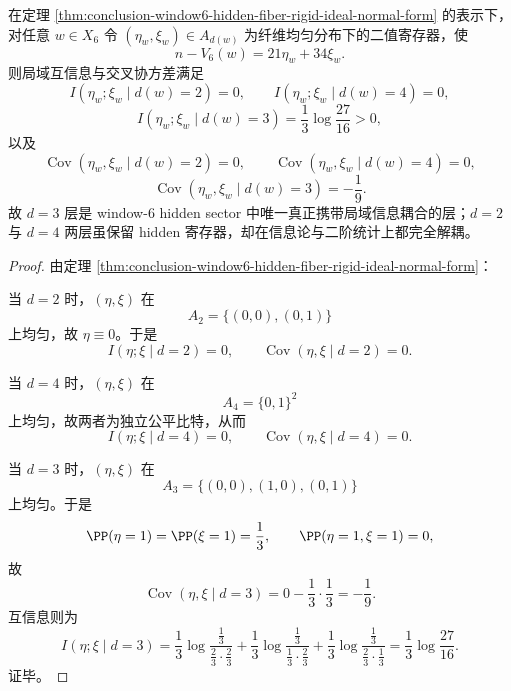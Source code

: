 \begin{theorem}\label{thm:conclusion-window6-d2-slice-unique-local-interaction-layer}
在定理 \ref{thm:conclusion-window6-hidden-fiber-rigid-ideal-normal-form} 的表示下，对任意 \(w\in X_6\) 令 \((\eta_w,\xi_w)\in A_{d(w)}\) 为纤维均匀分布下的二值寄存器，使
\[
n-V_6(w)=21\eta_w+34\xi_w.
\]
则局域互信息与交叉协方差满足
\[
I(\eta_w;\xi_w\mid d(w)=2)=0,\qquad
I(\eta_w;\xi_w\mid d(w)=4)=0,
\]
\[
I(\eta_w;\xi_w\mid d(w)=3)
=
\frac13\log\frac{27}{16}>0,
\]
以及
\[
\operatorname{Cov}(\eta_w,\xi_w\mid d(w)=2)=0,\qquad
\operatorname{Cov}(\eta_w,\xi_w\mid d(w)=4)=0,
\]
\[
\operatorname{Cov}(\eta_w,\xi_w\mid d(w)=3)=-\frac19.
\]
故 \(d=3\) 层是 window-\(6\) hidden sector 中唯一真正携带局域信息耦合的层；\(d=2\) 与 \(d=4\) 两层虽保留 hidden 寄存器，却在信息论与二阶统计上都完全解耦。
\end{theorem}
\begin{proof}
由定理 \ref{thm:conclusion-window6-hidden-fiber-rigid-ideal-normal-form}：

当 \(d=2\) 时，\((\eta,\xi)\) 在
\[
A_2=\{(0,0),(0,1)\}
\]
上均匀，故 \(\eta\equiv 0\)。于是
\[
I(\eta;\xi\mid d=2)=0,
\qquad
\operatorname{Cov}(\eta,\xi\mid d=2)=0.
\]

当 \(d=4\) 时，\((\eta,\xi)\) 在
\[
A_4=\{0,1\}^2
\]
上均匀，故两者为独立公平比特，从而
\[
I(\eta;\xi\mid d=4)=0,
\qquad
\operatorname{Cov}(\eta,\xi\mid d=4)=0.
\]

当 \(d=3\) 时，\((\eta,\xi)\) 在
\[
A_3=\{(0,0),(1,0),(0,1)\}
\]
上均匀。于是
\[
\PP(\eta=1)=\PP(\xi=1)=\frac13,
\qquad
\PP(\eta=1,\xi=1)=0,
\]
故
\[
\operatorname{Cov}(\eta,\xi\mid d=3)=0-\frac13\cdot\frac13=-\frac19.
\]
互信息则为
\[
I(\eta;\xi\mid d=3)
=
\frac13\log\frac{\frac13}{\frac23\cdot\frac23}
+\frac13\log\frac{\frac13}{\frac13\cdot\frac23}
+\frac13\log\frac{\frac13}{\frac23\cdot\frac13}
=
\frac13\log\frac{27}{16}.
\]
证毕。
\end{proof}

